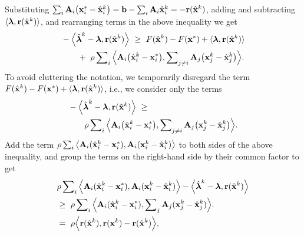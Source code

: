 \documentclass[doublecolumn]{IEEEtran}
\begin{document}
Substituting $ \sum_i { {\bf A} }_i\big({ {\bf x} }_i^*-\hat{ {\bf x} }_i^k\big) =  { {\bf b} } - \sum_i { {\bf A} }_i  \hat{ {\bf x} }_i^k = -{ {\bf r} }({\hat{\mathbf x}}^k)$, adding and subtracting $\langle{\boldsymbol{\lambda}}, { {\bf r} }({\hat{\mathbf x}}^k) \rangle$, and rearranging terms in the above inequality  we get
\begin{align*}
&   -\Big\langle \hat{\boldsymbol{\lambda}}^k-{\boldsymbol{\lambda}} , { {\bf r} }({\hat{\mathbf x}}^k) \Big\rangle   ~\geq~  F(\hat{ {\bf x} }^k) - F({ {\bf x} }^*) + \langle{\boldsymbol{\lambda}}, { {\bf r} }({\hat{\mathbf x}}^k) \rangle\\
&\qquad+~ \rho \sum\nolimits_{i} \Big\langle { {\bf A} }_i\big(\hat{ {\bf x} }_i^k - { {\bf x} }_i^*\big) , \sum\nolimits_{j\neq i}{ {\bf A} }_j \big( { {\bf x} }_j^k- \hat{ {\bf x} }_j^k \big)\Big\rangle. \notag
\end{align*}
To avoid cluttering the notation, we temporarily disregard the term $F(\hat{ {\bf x} }^k) - F({ {\bf x} }^*) + \langle{\boldsymbol{\lambda}}, { {\bf r} }({\hat{\mathbf x}}^k) \rangle$, i.e., we consider only the terms
\begin{align*}
&   -\Big\langle \hat{\boldsymbol{\lambda}}^k-{\boldsymbol{\lambda}} , { {\bf r} }({\hat{\mathbf x}}^k) \Big\rangle   ~\geq~ \\
&\qquad\rho \sum\nolimits_{i} \Big\langle { {\bf A} }_i\big(\hat{ {\bf x} }_i^k - { {\bf x} }_i^*\big) , \sum\nolimits_{j\neq i}{ {\bf A} }_j \big( { {\bf x} }_j^k- \hat{ {\bf x} }_j^k \big)\Big\rangle. \notag
\end{align*}
Add the term ${\rho}\sum_i\big\langle { {\bf A} }_i( {\hat{\mathbf x}}_i^k -{ {\bf x} }_i^*) , { {\bf A} }_i({ {\bf x} }_i^k-{\hat{\mathbf x}}_i^k) \big\rangle$ to both sides of the above inequality, and group the terms on the right-hand side by their common factor to get
\begin{align}\label{2}
& {\rho}\sum\nolimits_i\Big\langle { {\bf A} }_i( {\hat{\mathbf x}}_i^k -{ {\bf x} }_i^*) , { {\bf A} }_i({ {\bf x} }_i^k-{\hat{\mathbf x}}_i^k) \Big\rangle - \Big\langle \hat{\boldsymbol{\lambda}}^k-{\boldsymbol{\lambda}} ,  { {\bf r} }({\hat{\mathbf x}}^k) \Big\rangle \nonumber\\
&  \geq~ {\rho}\sum\nolimits_i\Big\langle { {\bf A} }_i( {\hat{\mathbf x}}_i^k -{ {\bf x} }_i^*) , \sum\nolimits_j { {\bf A} }_j({ {\bf x} }_j^k-{\hat{\mathbf x}}_j^k) \Big\rangle.\notag\\
& =~ {\rho}\Big\langle { {\bf r} }({\hat{\mathbf x}}^k)  , { {\bf r} }({ {\bf x} }^k) - { {\bf r} }({\hat{\mathbf x}}^k) \Big\rangle,
\end{align}
\end{document}
